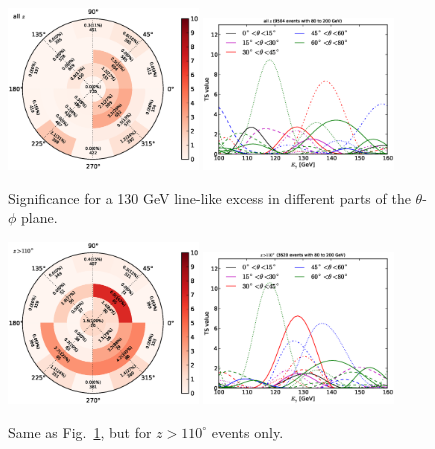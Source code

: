 \documentclass[aps,twocolumn,prd,superscriptaddress,showpacs,nofootinbib,fixfloat]{revtex4}
\begin{document}
\begin{figure}[p]
  \centering
  \includegraphics[width=0.45\textwidth]{plots/polar_all.eps}
  \includegraphics[width=0.45\textwidth]{plots/scan_all.eps}
  \caption{Significance for a 130 GeV line-like excess in different parts of
  the $\theta$-$\phi$ plane.}
  \label{fig:polarPlotsAll}
\end{figure}

\begin{figure}[p]
  \centering
  \includegraphics[width=0.45\textwidth]{plots/polar_z.GT.110.eps}
  \includegraphics[width=0.45\textwidth]{plots/scan_z.GT.110.eps}
  \caption{Same as Fig.~\ref{fig:polarPlotsAll}, but for $z>110^\circ$ events
  only.}
  \label{fig:polarPlots110}
\end{figure}
\end{document}
